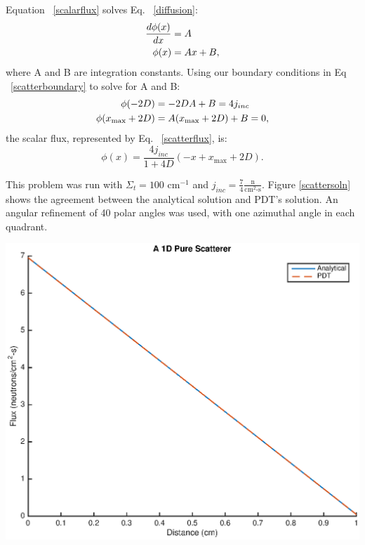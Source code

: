 Equation ~\eqref{scalarflux} solves Eq. ~\eqref{diffusion}:
\begin{align}
\frac{d\phi(x)}{dx} &= A \notag \\
\phi(x) &= Ax + B,
\label{scalarflux}
\end{align}
where A and B are integration constants. Using our boundary conditions in Eq ~\eqref{scatterboundary} to solve for A and B:
\begin{align}
\phi(-2D) &= -2DA + B = 4j_{inc} \notag \\
\phi(x_{\text{max}} + 2D) &= A(x_{\text{max}} + 2D) + B = 0, \notag
\label{notimportant}
\end{align}
the scalar flux, represented by Eq. ~\eqref{scatterflux}, is:
\begin{equation}
\phi(x) = \frac{4j_{inc}}{1+4D}(-x + x_{\text{max}} + 2D).
\label{scatterflux}
\end{equation}

This problem was run with $\Sigma_t = 100 \text{ cm}^{-1}$ and $j_{inc} = \frac{7}{4} \frac{\text{n}}{\text{cm}^2\text{-s}}$. Figure \ref{scattersoln} shows the agreement between the analytical solution and PDT's solution. An angular refinement of 40 polar angles was used, with one azimuthal angle in each quadrant.

\noindent\begin{minipage}{\textwidth}
\centering
\includegraphics[scale = 0.8]{figures/PureScatterer.eps}
\label{scattersoln}
\end{minipage}
\smallskip


